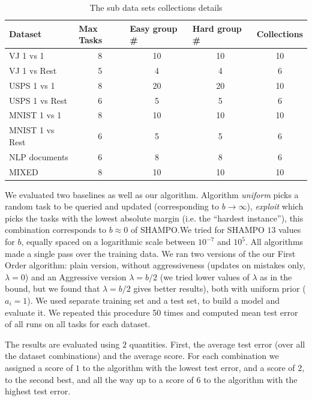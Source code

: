 \begin{table}[h]
\centering
\caption{The sub data sets collections details}
\label{tab:collections}
\begin{tabular}{|l|c|c|c|c|}
\hline
Dataset & \multicolumn{1}{l|}{Max Tasks} & \multicolumn{1}{l|}{Easy group \#} & \multicolumn{1}{l|}{Hard group \#} & \multicolumn{1}{l|}{Collections} \\ \hline
VJ 1 vs 1 & 8 & 10 & 10 & 10 \\ \cline{1-1}
VJ 1 vs Rest & 5 & 4 & 4 & 6 \\ \cline{1-1}
USPS 1 vs 1 & 8 & 20 & 20 & 10 \\ \cline{1-1}
USPS 1 vs Rest & 6 & 5 & 5 & 6 \\ \cline{1-1}
MNIST 1 vs 1 & 8 & 10 & 10 & 10 \\ \cline{1-1}
MNIST 1 vs Rest & 6 & 5 & 5 & 6 \\ \cline{1-1}
NLP documents & 6 & 8 & 8 & 6 \\ \cline{1-1}
MIXED & 8 & 10 & 10 & 10 \\ \hline
\end{tabular}
\end{table}


We evaluated two baselines as well as our algorithm. Algorithm {\em uniform} picks a random task to be 
queried and updated (corresponding to $b\rightarrow\infty$), {\em exploit} which picks the tasks with the 
lowest absolute margin (i.e. the ``hardest instance''), this combination corresponds to $b \approx 0$ of 
SHAMPO.\@ We tried for SHAMPO $13$ values for $b$, equally spaced on a logarithmic scale between 
$10^{-7}$ and $10^{5}$. 
All algorithms made a single pass over the training data. We ran two versions of the our First Order algorithm: 
plain version, without aggressiveness (updates on mistakes only, $\lambda=0$) and an 
Aggressive version $\lambda=b/2$ (we tried lower values of $\lambda$ as in the bound, 
but we found that $\lambda=b/2$ gives better results), both with uniform prior ($a_i=1$). 
We used separate training set and a test set, to build a model and evaluate it. We repeated this procedure 
50 times and computed mean test error of all runs on all tasks for each dataset. 

The results are evaluated using $2$ quantities. First, the average test error (over all the dataset combinations) 
and the average score. For each combination we assigned a score of $1$ to the algorithm with the lowest 
test error, and a score of $2$, to the second best, and all the way up to a score of $6$ to the algorithm with 
the highest test error.



